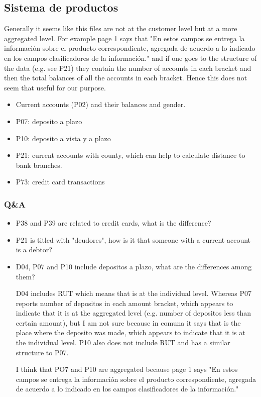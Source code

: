 \documentclass[12pt]{article}
\theoremstyle{plain}
\theoremstyle{plain}
\theoremstyle{definition}  %
\theoremstyle{remark}  %
\begin{document}
\subsection{Sistema de productos}


Generally it seems like this files are not at the customer level but at a more aggregated level. For example page 1 says that "En estos campos se entrega la información sobre el producto correspondiente, agregada de acuerdo a lo indicado en los campos clasificadores de la información." and if one goes to the structure of the data (e.g. see P21) they contain the number of accounts in each bracket and then the total balances of all the accounts in each bracket. Hence this does not seem that useful for our purpose.

\begin{itemize}
    \item Current accounts (P02) and their balances and gender. 
    \item P07: deposito a plazo

    \item P10: deposito a vista y a plazo
    \item P21: current accounts with county, which can help to calculate distance to bank branches. 
    \item P73: credit card transactions
\end{itemize}
 




\subsubsection{Q\&A}
\begin{itemize}
    \item P38 and P39 are related to credit cards, what is the difference?
    
    \item P21 is titled with "deudores", how is it that someone with a current account is a debtor?

    \item  D04, P07 and P10 include depositos a plazo, what are the differences among them?

    D04 includes RUT which means that is at the individual level. Whereas P07 reports number of depositos in each amount bracket, which appears to indicate that it is at the aggregated level (e.g. number of depositos less than certain amount), but I am not sure because in comuna it says that is the place where the deposito was made, which appears to indicate that it is at the individual level. 
    P10 also does not include RUT and has a similar structure to P07. 

    I think that PO7 and P10 are aggregated because page 1 says "En estos campos se entrega la información sobre el producto correspondiente, agregada de acuerdo a lo indicado en los campos clasificadores de la información." 
\end{itemize}
\end{document}
